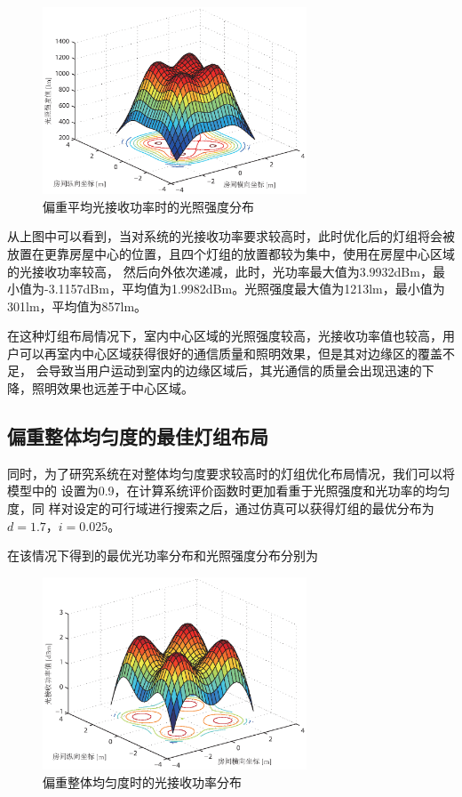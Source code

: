 \begin{figure}[htbp]
    \centering
	\includegraphics[width=0.7\textwidth]{figures/chapter-3/PowerFirstIllu.eps}
	\caption{偏重平均光接收功率时的光照强度分布}
	\label{fig:power_first_illu}
\end{figure}

从上图中可以看到，当对系统的光接收功率要求较高时，此时优化后的灯组将会被放置在更靠房屋中心的位置，且四个灯组的放置都较为集中，使用在房屋中心区域的光接收功率较高，
然后向外依次递减，此时，光功率最大值为3.9932dBm，最小值为-3.1157dBm，平均值为1.9982dBm。光照强度最大值为1213lm，最小值为301lm，平均值为857lm。

在这种灯组布局情况下，室内中心区域的光照强度较高，光接收功率值也较高，用户可以再室内中心区域获得很好的通信质量和照明效果，但是其对边缘区的覆盖不足，
会导致当用户运动到室内的边缘区域后，其光通信的质量会出现迅速的下降，照明效果也远差于中心区域。

\subsection{偏重整体均匀度的最佳灯组布局}
同时，为了研究系统在对整体均匀度要求较高时的灯组优化布局情况，我们可以将模型中的 设置为0.9，在计算系统评价函数时更加看重于光照强度和光功率的均匀度，同
样对设定的可行域进行搜索之后，通过仿真可以获得灯组的最优分布为$d = 1.7$，$i = 0.025$。

在该情况下得到的最优光功率分布和光照强度分布分别为

\begin{figure}[htbp]
    \centering
	\includegraphics[width=0.7\textwidth]{figures/chapter-3/BalanceFirstPower.eps}
	\caption{偏重整体均匀度时的光接收功率分布}
	\label{fig:balance_first_power}
\end{figure}

